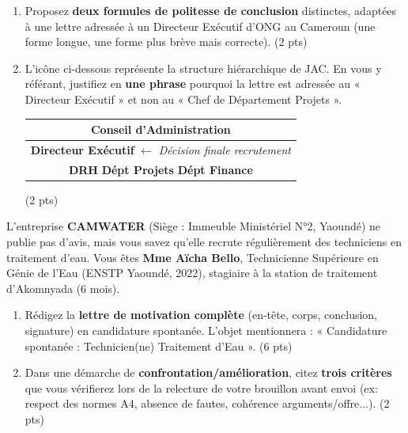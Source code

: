 \documentclass[11pt]{article}
\begin{document}
\begin{exercice}
\begin{enumerate}
    \item Proposez \textbf{deux formules de politesse de conclusion} distinctes, adaptées à une lettre adressée à un Directeur Exécutif d'ONG au Cameroun (une forme longue, une forme plus brève mais correcte). \hfill (2 pts)
    \item L'icône ci-dessous représente la structure hiérarchique de JAC. En vous y référant, justifiez en \textbf{une phrase} pourquoi la lettre est adressée au « Directeur Exécutif » et non au « Chef de Département Projets ».\\
    \begin{center}
    \begin{tabular}{|c|}
    \hline
    \textbf{Conseil d'Administration} \\
    \hline
    \textbf{Directeur Exécutif} $\leftarrow$ \textit{Décision finale recrutement} \\
    \hline
    \textbf{DRH} \quad \textbf{Dépt Projets} \quad \textbf{Dépt Finance} \\
    \hline
    \end{tabular}
    \end{center}
    \hfill (2 pts)
\end{enumerate}
\end{exercice}

\begin{exercice}
L'entreprise \textbf{CAMWATER} (Siège : Immeuble Ministériel N°2, Yaoundé) ne publie pas d'avis, mais vous savez qu'elle recrute régulièrement des techniciens en traitement d'eau. Vous êtes \textbf{Mme Aïcha Bello}, Technicienne Supérieure en Génie de l'Eau (ENSTP Yaoundé, 2022), stagiaire à la station de traitement d'Akomnyada (6 mois).

\begin{enumerate}
    \item Rédigez la \textbf{lettre de motivation complète} (en-tête, corps, conclusion, signature) en candidature spontanée. L'objet mentionnera : « Candidature spontanée : Technicien(ne) Traitement d'Eau ». \hfill (6 pts)
    \item Dans une démarche de \textbf{confrontation/amélioration}, citez \textbf{trois critères} que vous vérifierez lors de la relecture de votre brouillon avant envoi (ex: respect des normes A4, absence de fautes, cohérence arguments/offre...). \hfill (2 pts)
\end{enumerate}
\end{exercice}
\end{document}
